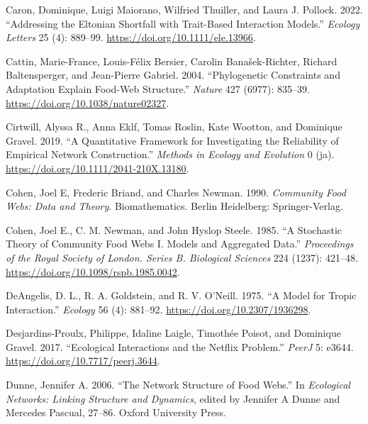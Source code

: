 \documentclass[
  letterpaper,
  DIV=11,
  numbers=noendperiod]{scrartcl}
\newlength{\cslhangindent}
\newenvironment{CSLReferences}[2] %
 {\begin{list}{}{%
  \setlength{\itemindent}{0pt}
  \setlength{\leftmargin}{0pt}
  \setlength{\parsep}{0pt}
  \ifodd #1
   \setlength{\leftmargin}{\cslhangindent}
   \setlength{\itemindent}{-1\cslhangindent}
  \fi
  \setlength{\itemsep}{#2\baselineskip}}}
 {\end{list}}
\begin{document}
\begin{CSLReferences}{1}{0}
Caron, Dominique, Luigi Maiorano, Wilfried Thuiller, and Laura J.
Pollock. 2022. {``Addressing the {Eltonian} Shortfall with Trait-Based
Interaction Models.''} \emph{Ecology Letters} 25 (4): 889--99.
\url{https://doi.org/10.1111/ele.13966}.

Cattin, Marie-France, Louis-Félix Bersier, Carolin Banašek-Richter,
Richard Baltensperger, and Jean-Pierre Gabriel. 2004. {``Phylogenetic
Constraints and Adaptation Explain Food-Web Structure.''} \emph{Nature}
427 (6977): 835--39. \url{https://doi.org/10.1038/nature02327}.

Cirtwill, Alyssa R., Anna Eklf, Tomas Roslin, Kate Wootton, and
Dominique Gravel. 2019. {``A Quantitative Framework for Investigating
the Reliability of Empirical Network Construction.''} \emph{Methods in
Ecology and Evolution} 0 (ja).
\url{https://doi.org/10.1111/2041-210X.13180}.

Cohen, Joel E, Frederic Briand, and Charles Newman. 1990.
\emph{Community {Food Webs}: {Data} and {Theory}}. Biomathematics.
Berlin Heidelberg: Springer-Verlag.

Cohen, Joel E., C. M. Newman, and John Hyslop Steele. 1985. {``A
Stochastic Theory of Community Food Webs {I}. {Models} and Aggregated
Data.''} \emph{Proceedings of the Royal Society of London. Series B.
Biological Sciences} 224 (1237): 421--48.
\url{https://doi.org/10.1098/rspb.1985.0042}.

DeAngelis, D. L., R. A. Goldstein, and R. V. O'Neill. 1975. {``A {Model}
for {Tropic Interaction}.''} \emph{Ecology} 56 (4): 881--92.
\url{https://doi.org/10.2307/1936298}.

Desjardins-Proulx, Philippe, Idaline Laigle, Timothée Poisot, and
Dominique Gravel. 2017. {``Ecological Interactions and the {Netflix}
Problem.''} \emph{PeerJ} 5: e3644.
\url{https://doi.org/10.7717/peerj.3644}.

Dunne, Jennifer A. 2006. {``The {Network Structure} of {Food Webs}.''}
In \emph{Ecological Networks: {Linking} Structure and Dynamics}, edited
by Jennifer A Dunne and Mercedes Pascual, 27--86. Oxford University
Press.


\end{CSLReferences}
\end{document}
